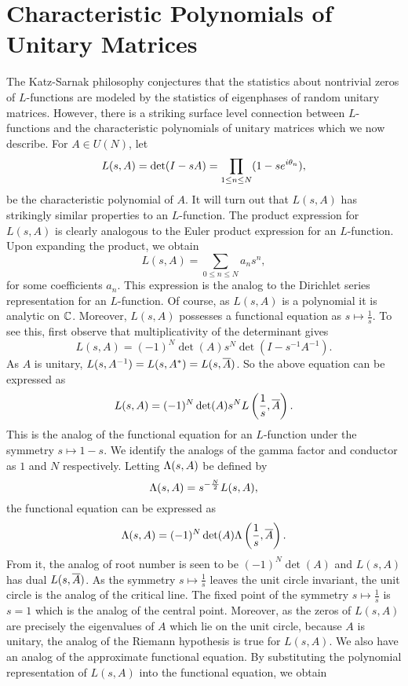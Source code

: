   \section{Characteristic Polynomials of Unitary Matrices}
    The Katz-Sarnak philosophy conjectures that the statistics about nontrivial zeros of $L$-functions are modeled by the statistics of eigenphases of random unitary matrices. However, there is a striking surface level connection between $L$-functions and the characteristic polynomials of unitary matrices which we now describe. For $A \in U(N)$, let
    \[
      L(s,A) = \det(I-sA) = \prod_{1 \le n \le N}(1-se^{i\theta_{n}}),
    \]
    be the characteristic polynomial of $A$. It will turn out that $L(s,A)$ has strikingly similar properties to an $L$-function. The product expression for $L(s,A)$ is clearly analogous to the Euler product expression for an $L$-function. Upon expanding the product, we obtain
    \[
      L(s,A) = \sum_{0 \le n \le N}a_{n}s^{n},
    \]
    for some coefficients $a_{n}$. This expression is the analog to the Dirichlet series representation for an $L$-function. Of course, as $L(s,A)$ is a polynomial it is analytic on $\mathbb{C}$. Moreover, $L(s,A)$ possesses a functional equation as $s \mapsto \frac{1}{s}$. To see this, first observe that multiplicativity of the determinant gives
    \[
      L(s,A) = (-1)^{N}\det(A)s^{N}\det(I-s^{-1}A^{-1}).
    \]
    As $A$ is unitary, $L(s,A^{-1}) = L(s,A^{\ast}) = L(s,\overline{A})$. So the above equation can be expressed as
    \[
      L(s,A) = (-1)^{N}\det(A)s^{N}L\left(\frac{1}{s},\overline{A}\right).
    \]
    This is the analog of the functional equation for an $L$-function under the symmetry $s \mapsto 1-s$. We identify the analogs of the gamma factor and conductor as $1$ and $N$ respectively. Letting $\Lambda(s,A)$ be defined by
    \[
      \Lambda(s,A) = s^{-\frac{N}{2}}L(s,A),
    \]
    the functional equation can be expressed as
    \[
        \Lambda(s,A) = (-1)^{N}\det(A) \Lambda\left(\frac{1}{s},\overline{A}\right).
    \]
    From it, the analog of root number is seen to be $(-1)^{N}\det(A)$ and $L(s,A)$ has dual $L(s,\overline{A})$. As the symmetry $s \mapsto \frac{1}{s}$ leaves the unit circle invariant, the unit circle is the analog of the critical line. The fixed point of the symmetry $s \mapsto \frac{1}{s}$ is $s = 1$ which is the analog of the central point. Moreover, as the zeros of $L(s,A)$ are precisely the eigenvalues of $A$ which lie on the unit circle, because $A$ is unitary, the analog of the Riemann hypothesis is true for $L(s,A)$. We also have an analog of the approximate functional equation. By substituting the polynomial representation of $L(s,A)$ into the functional equation, we obtain
